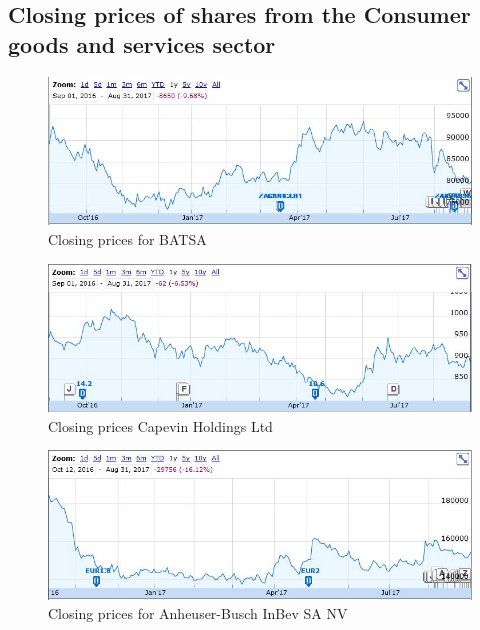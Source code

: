 \documentclass[letterpaper, 10 pt, conference]{ieeeconf}  %
\begin{document}
\label{sec:flowChart}

\subsection{Closing prices of shares from the Consumer goods and services sector}

\begin{figure}[h!]
\centering
\includegraphics[scale=0.43]{BATSA.JPG}
\caption{Closing prices for BATSA \cite{BATSA}}
\label{fig:BASTA}
\end{figure}

\begin{figure}[h!]
\centering
\includegraphics[scale=0.43]{capevin.JPG}
\caption{Closing prices Capevin Holdings Ltd \cite{capevin}}
\label{fig:capevin}
\end{figure}

\begin{figure}[h!]
\centering
\includegraphics[scale=0.43]{inbev.JPG}
\caption{Closing prices for Anheuser-Busch InBev SA NV \cite{inbev}}
\label{fig:inbev}
\end{figure}
\end{document}

